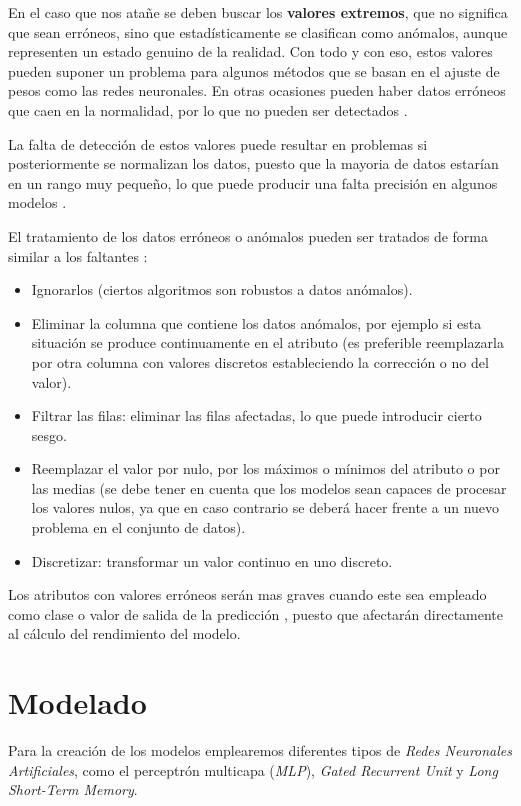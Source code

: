 En el caso que nos atañe se deben buscar los \textbf{valores extremos}, que no significa que sean erróneos, sino que 
estadísticamente se clasifican como anómalos, aunque representen un estado genuino de la realidad.
Con todo y con eso, estos valores pueden suponer un problema para algunos métodos que se basan en el ajuste de pesos
como las redes neuronales.
En otras ocasiones pueden haber datos erróneos que caen en la normalidad, por lo que no pueden ser detectados \cite{book:hernandez2004}.

La falta de detección de estos valores puede resultar en problemas si posteriormente se normalizan los datos, puesto
que la mayoria de datos estarían en un rango muy pequeño, lo que puede producir una falta precisión en algunos modelos \cite{book:hernandez2004}.

El tratamiento de los datos erróneos o anómalos pueden ser tratados de forma similar a los faltantes \cite{book:hernandez2004}:
\begin{itemize}
    \item Ignorarlos (ciertos algoritmos son robustos a datos anómalos).
    \item Eliminar la columna que contiene los datos anómalos, por ejemplo si esta situación se produce
        continuamente en el atributo (es preferible reemplazarla por otra columna con valores discretos
        estableciendo la corrección o no del valor).
    \item Filtrar las filas: eliminar las filas afectadas, lo que puede introducir cierto sesgo.
    \item Reemplazar el valor por nulo, por los máximos o mínimos del atributo o por
        las medias (se debe tener en cuenta que los modelos sean capaces de procesar los valores
        nulos, ya que en caso contrario se deberá hacer frente a un nuevo problema en el conjunto
        de datos).
    \item Discretizar: transformar un valor continuo en uno discreto.
\end{itemize}
Los atributos con valores erróneos serán mas graves cuando este sea empleado como clase o valor de salida de la predicción \cite{book:hernandez2004},
puesto que afectarán directamente al cálculo del rendimiento del modelo. 

\section{Modelado}

Para la creación de los modelos emplearemos diferentes tipos de \textit{Redes Neuronales Artificiales}, como 
el perceptrón multicapa (\textit{MLP}), \textit{Gated Recurrent Unit} y \textit{Long Short-Term Memory}.

